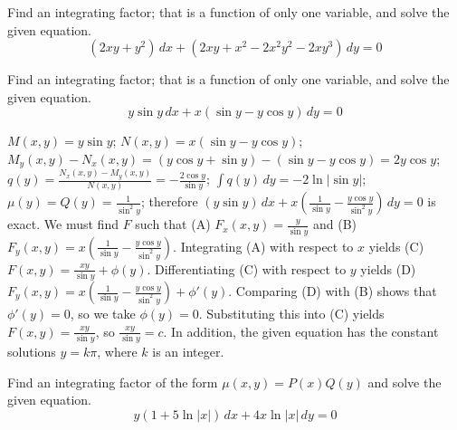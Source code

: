\documentclass{ximera}
\begin{document}
\begin{problem}\label{exer:2.6.15} Find an integrating factor; that is a function of only one variable, and solve the given equation.
$$(2xy+y^2)\,dx+(2xy+x^2-2x^2y^2-2xy^3)\,dy=0$$
\end{problem}

\begin{problem}\label{exer:2.6.16} Find an integrating factor; that is a function of only one variable, and solve the given equation.
$$y\sin y\,dx+x(\sin y-y\cos y)\,dy=0$$



\begin{solution}
    $M(x,y)=y\sin y$;\;
$N(x,y)=x(\sin y-y\cos y)$;\;
 $M_y(x,y)-N_x(x,y)=(y\cos y+\sin y)-(\sin y-y\cos y)=2y\cos y$;
$q(y)=\frac{N_x(x,y)-M_y(x,y)}{ N(x,y)}=-\frac{2\cos y}{\sin y}$;\;
$\int q(y)\,dy=-2\ln|\sin y|$;\;
$\mu(y)=Q(y)=\frac{1}{\sin^2y}$;
therefore
$\left({y}{\sin y}\right)\,dx+
x\left(\frac{1}{\sin y}-\frac{y\cos y}{\sin^2y}\right)\,dy=0$
is exact. We must find $F$ such that
(A) $F_x(x,y)=\frac{y}{\sin y}$ and
(B) $F_y(x,y)=x\left(\frac{1}{\sin y}-\frac{y\cos y}{\sin^2y}\right)$.
Integrating (A) with respect to $x$ yields
(C) $F(x,y)=\frac{xy}{\sin y}+\phi(y)$.
Differentiating (C) with respect to $y$  yields
(D) $F_y(x,y)=x\left(\frac{1}{\sin y}-\frac{y\cos y}{\sin^2y}\right)
+\phi'(y)$.
Comparing (D) with (B)  shows that
$\phi'(y)=0$, so we take
$\phi(y)=0$.
Substituting this into (C) yields
$F(x,y)=\frac{xy}{\sin y}$,
so $\frac{xy}{\sin y}=c$. In addition, the given equation has the
constant solutions $y=k\pi$, where $k$ is an integer.
\end{solution}
\end{problem}

\begin{problem}\label{exer:2.6.17} Find an integrating factor of the form $\mu(x,y)=P(x)Q(y)$ and solve the given equation.
$$y(1+5\ln|x|)\,dx+4x\ln|x|\,dy=0$$
\end{problem}
\end{document}
